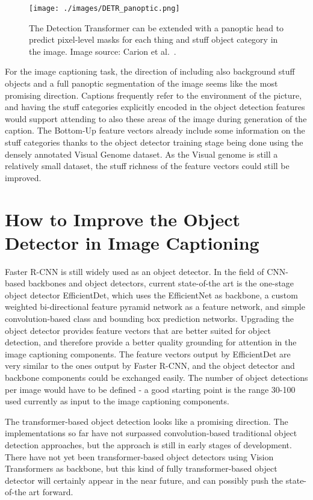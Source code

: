 \documentclass[english,twoside,openright]{HYgraduMLDS}
\begin{document}
\begin{figure}[h] 
\centering
\texttt{[image: ./images/DETR\_panoptic.png]}
\caption{The Detection Transformer can be extended with a panoptic head to predict pixel-level masks for each thing and stuff object category in the image. Image source: Carion et al.~\cite{DETR}.}
\label{fig:DETR_panoptic} 
\end{figure}

For the image captioning task, the direction of including also background stuff objects and a full panoptic segmentation of the image seems like the most promising direction. Captions frequently refer to the environment of the picture, and having the stuff categories explicitly encoded in the object detection features would support attending to also these areas of the image during generation of the caption. The Bottom-Up feature vectors already include some information on the stuff categories thanks to the object detector training stage being done using the densely annotated Visual Genome dataset. As the Visual genome is still a relatively small dataset, the stuff richness of the feature vectors could still be improved.

\section{How to Improve the Object Detector in Image Captioning}
\label{section:ImprovingObjectDetector}
Faster R-CNN is still widely used as an object detector. In the field of CNN-based backbones and object detectors, current state-of-the art is the one-stage object detector EfficientDet, which uses the EfficientNet as backbone, a custom weighted bi-directional feature pyramid network as a feature network, and simple convolution-based class and bounding box prediction networks. Upgrading the object detector provides feature vectors that are better suited for object detection, and therefore provide a better quality grounding for attention in the image captioning components. The feature vectors output by EfficientDet are very similar to the ones output by Faster R-CNN, and the object detector and backbone components could be exchanged easily. The number of object detections per image would have to be defined - a good starting point is the range 30-100 used currently as input to the image captioning components. 

The transformer-based object detection looks like a promising direction. The implementations so far have not surpassed convolution-based traditional object detection approaches, but the approach is still in early stages of development. There have not yet been transformer-based object detectors using Vision Transformers as backbone, but this kind of fully transformer-based object detector will certainly appear in the near future, and can possibly push the state-of-the art forward. 
\end{document}

